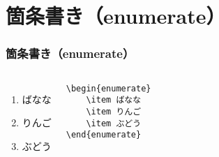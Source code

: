 \section{箇条書き（enumerate）}
\begin{frame}[fragile]
    \frametitle{箇条書き（enumerate）}
    \begin{columns}
        \begin{enumerate}
            \item ばなな
            \item りんご
            \item ぶどう
        \end{enumerate}
        \begin{verbatim}
\begin{enumerate}
    \item ばなな
    \item りんご
    \item ぶどう
\end{enumerate}
        \end{verbatim}
    \end{columns}
\end{frame}
